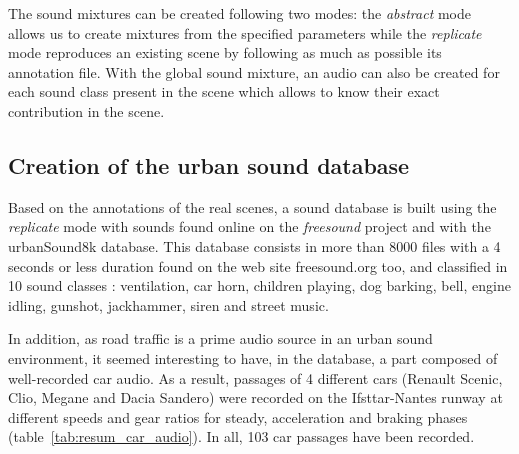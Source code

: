 \documentclass[a4,11pt,twocolumn]{article}
\begin{document}
The sound mixtures can be created following two modes: the \textit{abstract} mode allows us to create mixtures from the specified parameters while the \textit{replicate} mode reproduces an existing scene by following as much as possible its annotation file. With the global sound mixture, an audio can also be created for each sound class present in the scene which allows to know their exact contribution in the scene. %

\subsection{Creation of the urban sound database}
Based on the annotations of the real scenes, a sound database is built using the \textit{replicate} mode with sounds found online on the \textit{freesound} project and with the urbanSound8k database\cite{salamon_dataset_nodate}. This database consists in more than 8000 files with a 4 seconds or less duration found on the web site freesound.org too, and classified in 10 sound classes : ventilation, car horn, children playing, dog barking, bell, engine idling, gunshot, jackhammer, siren and street music. %

In addition, as road traffic is a prime audio source in an urban sound environment, it seemed interesting to have, in the database, a part composed of well-recorded car audio. As a result, passages of 4 different cars (Renault Scenic, Clio, Megane and Dacia Sandero) were recorded on the Ifsttar-Nantes runway at different speeds and gear ratios for steady, acceleration and braking phases (table~\ref{tab:resum_car_audio}). In all, 103 car passages have been recorded. \\
\end{document}
